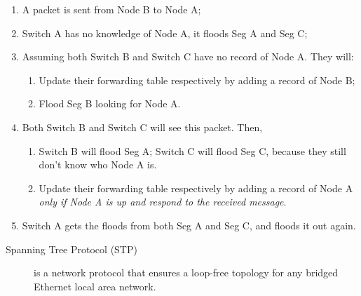 \begin{enumerate}
\item A packet is sent from Node B to Node A;
\item Switch A has no knowledge of Node A, it floods Seg A and Seg C;
\item Assuming both Switch B and Switch C have no record of Node A. They will:
  \begin{enumerate}
  \item Update their forwarding table respectively by adding a record of Node B;
  \item Flood Seg B looking for Node A.
  \end{enumerate}
\item Both Switch B and Switch C will see this packet. Then,
  \begin{enumerate}
  \item Switch B will flood Seg A; Switch C will flood Seg C, because they still don't
    know who Node A is.
  \item Update their forwarding table respectively by adding a record
    of Node A \emph{only if Node A is up and respond to the received message}.
  \end{enumerate}
\item Switch A gets the floods from both Seg A and Seg C, and floods it out again.
\end{enumerate}

\begin{frame}
  \begin{description}
  \item[Spanning Tree Protocol (STP)] is a network protocol that ensures a loop-free
    topology for any bridged Ethernet local area network.
  \end{description}
  \begin{center}
  \end{center}
\end{frame}

